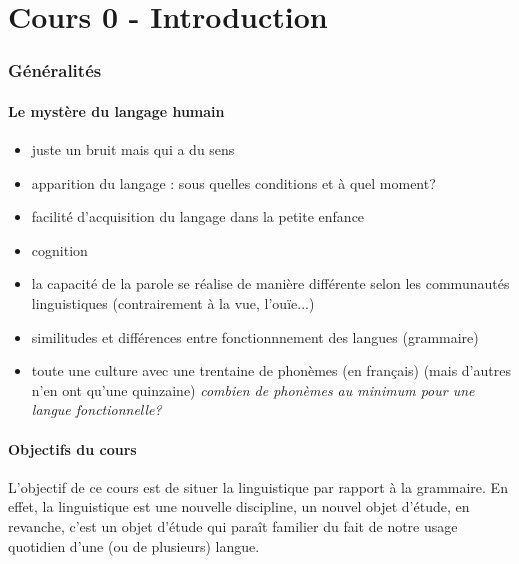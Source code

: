 
\part{Cours 0 - Introduction}
\section{Généralités}
\subsection{Le mystère du langage humain}
\begin{itemize}
   \item juste un bruit mais qui a du sens
   \item apparition du langage : sous quelles conditions et à quel moment?
   \item facilité d'acquisition du langage dans la petite enfance
   \item cognition
   \item la capacité de la parole se réalise de manière différente selon les communautés linguistiques (contrairement à la vue, l'ouïe...)
   \item similitudes et différences entre fonctionnnement des langues (grammaire)
   \item toute une culture avec une trentaine de phonèmes (en français) (mais d'autres n'en ont qu'une quinzaine) \textit{combien de phonèmes au minimum pour une langue fonctionnelle?}
\end{itemize}

\subsection{Objectifs du cours}
L'objectif de ce cours est de situer la linguistique par rapport à la grammaire.
En effet, la linguistique est une nouvelle discipline, un nouvel objet d'étude, en revanche, c'est un objet d'étude qui paraît familier du fait de notre usage quotidien d'une (ou de plusieurs) langue.

